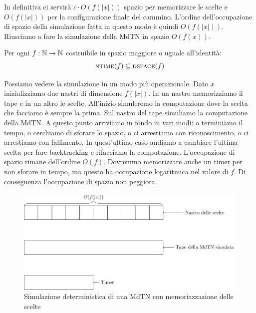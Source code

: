 In definitiva ci servirà $c\cdot O(f(|x|))$ spazio per memorizzare le scelte e $O(f(|x|))$ per la
configurazione finale del cammino. L'ordine dell'occupazione di spazio della simulazione fatta in
questo modo è quindi $O(f(|x|))$. Riusciamo a fare la simulazione della MdTN in spazio $O(f(x))$.

\begin{thm}\label{thm:ntimedspace}
    Per ogni $f:\mathbb{N} \to \mathbb{N}$ costruibile in spazio maggiore o uguale all'identità:
    \begin{equation*}
        \textsc{ntime}(f) \subseteq \textsc{dspace}(f)
    \end{equation*}
\end{thm}

Possiamo vedere la simulazione in un modo più operazionale. Dato $x$ inizializziamo due nastri di
dimensione $f(|x|)$. In un nastro memorizziamo il tape e in un altro le scelte. All'inizio
simuleremo la computazione dove la scelta che facciamo è sempre la prima. Sul nastro del tape
simuliamo la computazione della MdTN. A questo punto arriviamo in fondo in vari modi: o terminiamo
il tempo, o cerchiamo di sforare lo spazio, o ci arrestiamo con riconoscimento, o ci arrestiamo con
fallimento. In quest'ultimo caso andiamo a cambiare l'ultima scelta per fare backtracking e
rifacciamo la computazione. L'occupazione di spazio rimane dell'ordine $O(f)$. Dovremmo memorizzare
anche un timer per non sforare in tempo, ma questo ha occupazione logaritmica nel valore di $f$. Di
conseguenza l'occupazione di spazio non peggiora.

\begin{figure}[h]
    \begin{center}
        \includegraphics[scale=0.7]{./img/nondeterminism/Simulation.pdf}
        \caption{Simulazione deterministica di una MdTN con memoriazzazione delle scelte}
    \end{center}
\end{figure}

